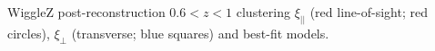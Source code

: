 \label{fig:wigglez_wedges_z60} WiggleZ post-reconstruction $0.6<z<1$ clustering $\xi_{||}$ (red line-of-sight; red circles), $\xi_{\perp}$ (transverse; blue squares) and best-fit models. 